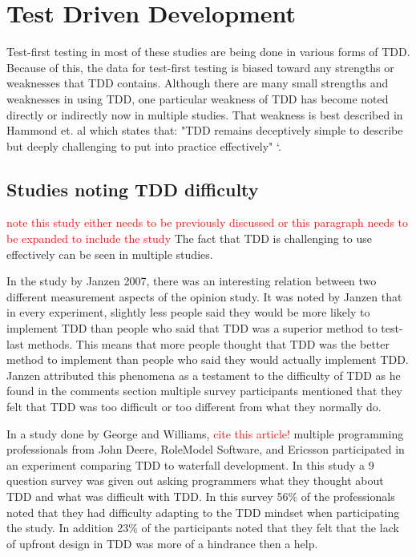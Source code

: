 \documentclass{sig-alternate}
\newcommand{\mycomment}[1]{\textcolor{red}{#1}}
\begin{document}
\section{Test Driven Development}
Test-first testing in most of these studies are being done in various forms of TDD.  Because of this, the data for test-first testing is biased toward any strengths or weaknesses that TDD contains.  Although there are many small strengths and weaknesses in using TDD, one particular weakness of TDD has become noted directly or indirectly now in multiple studies.  That weakness is best described in Hammond et. al which states that: "TDD remains deceptively simple to describe but deeply challenging to put into practice effectively" `\cite{Hammond:2012}.

\subsection{Studies noting TDD difficulty}
\mycomment{note this study either needs to be previously discussed or this paragraph needs to be expanded to include the study}
The fact that TDD is challenging to use effectively can be seen in multiple studies. 

In the study by Janzen 2007, there was an interesting relation between two different measurement aspects of the opinion study.  It was noted by Janzen that in every experiment, slightly less people said they would be more likely to implement TDD than people who said that TDD was a superior method to test-last methods. This means that more people thought that TDD was the better method to implement than  people who said they would actually implement TDD.  Janzen attributed this phenomena as a testament to the difficulty of TDD as he found in the comments section multiple survey participants mentioned that they felt that TDD was too difficult or too different from what they normally do.

In a study done by George and Williams,  \mycomment{cite this article!} multiple programming professionals from John Deere, RoleModel Software, and Ericsson participated in an experiment comparing TDD to waterfall development.  In this study a 9 question survey was given out asking programmers what they thought about TDD and what was difficult with TDD.  In this survey 56\% of the professionals noted that they had difficulty adapting to the TDD mindset when participating the study.  In addition 23\% of the participants noted that they felt that the lack of upfront design in TDD was more of a hindrance then a help. 
\end{document}

